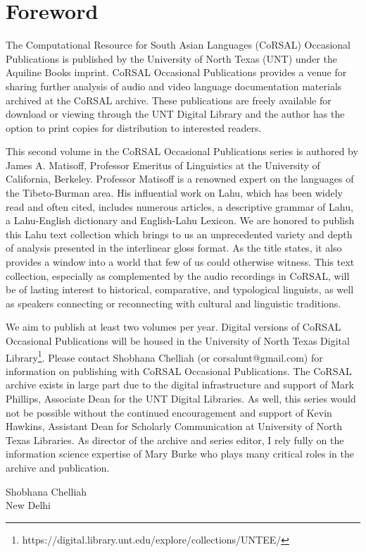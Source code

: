 \thispagestyle{empty}
\renewcommand{\thefootnote}{\arabic{footnote}}
\setcounter{footnote}{0}

\section*{Foreword}
The Computational Resource for South Asian Languages (CoRSAL)
Occasional Publications is published by the University of North Texas
(UNT) under the Aquiline Books imprint. CoRSAL Occasional Publications
provides a venue for sharing further analysis of audio and video
language documentation materials archived at the CoRSAL archive.
These publications are freely available for download or viewing
through the UNT Digital Library and the author has the option to print
copies for distribution to interested readers.

This second volume in the CoRSAL Occasional Publications series is
authored by James A. Matisoff, Professor Emeritus of Linguistics at
the University of California, Berkeley. Professor Matisoff is a
renowned expert on the languages of the Tibeto-Burman area.  His
influential work on Lahu, which has been widely read and often cited,
includes numerous articles, a descriptive grammar of Lahu, a
Lahu-English dictionary and English-Lahu Lexicon.  We are honored to
publish this Lahu text collection which brings to us an unprecedented
variety and depth of analysis presented in the interlinear gloss
format.  As the title states, it also provides a window into a world
that few of us could otherwise witness.  This text collection,
especially as complemented by the audio recordings in CoRSAL, will be
of lasting interest to historical, comparative, and typological
linguists, as well as speakers connecting or reconnecting with
cultural and linguistic traditions.

We aim to publish at least two volumes per year. Digital versions of
CoRSAL Occasional Publications will be housed in the University of
North Texas Digital Library\footnote{https://digital.library.unt.edu/explore/collections/UNTEE/}.  Please
contact Shobhana Chelliah (or corsalunt@gmail.com) for information on
publishing with CoRSAL Occasional Publications.  The CoRSAL archive
exists in large part due to the digital infrastructure and support of
Mark Phillips, Associate Dean for the UNT Digital Libraries.  As well,
this series would not be possible without the continued encouragement
and support of Kevin Hawkins, Assistant Dean for Scholarly
Communication at University of North Texas Libraries.  As director of
the archive and series editor, I rely fully on the information science
expertise of Mary Burke who plays many critical roles in the archive
and publication.

\vspace{4cm}
Shobhana Chelliah\\
New Delhi
